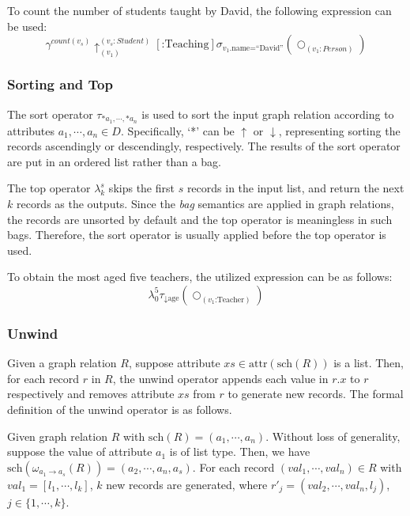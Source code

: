 \begin{example}
    To count the number of students taught by David, the following expression can be used:
    \begin{equation*}
        \gamma_{}^{count(v_s)}\uparrow_{(v_1)}^{(v_s:Student)}[\text{:Teaching}]\sigma_{v_1\text{.name=``David''}}(\bigcirc_{(v_1:Person)})
    \end{equation*}
\end{example}

\subsubsection{Sorting and Top}

The sort operator $\tau_{* a_1, \cdots, * a_n}$ is used to sort the input graph relation according to attributes $a_1, \cdots, a_n \in D$.
Specifically, `*' can be $\uparrow$ or $\downarrow$, representing sorting the records ascendingly or descendingly, respectively.
The results of the sort operator are put in an ordered list rather than a bag.

The top operator $\lambda_k^s$ skips the first $s$ records in the input list, and return the next $k$ records as the outputs.
Since the \emph{bag} semantics are applied in graph relations, the records are unsorted by default and the top operator is meaningless in such bags.
Therefore, the sort operator is usually applied before the top operator is used.

\begin{example}
    To obtain the most aged five teachers, the utilized expression can be as follows:
    \begin{equation*}
        \lambda_{0}^{5}\tau_{\downarrow \text{age}}(\bigcirc_{(v_1\text{:Teacher})})
    \end{equation*}
\end{example}


\subsubsection{Unwind}

Given a graph relation $R$, suppose attribute $xs \in \text{attr}(\text{sch}(R))$ is a list.
Then, for each record $r$ in $R$, the unwind operator appends each value in $r.x$ to $r$ respectively and removes attribute $xs$ from $r$ to generate new records.
The formal definition of the unwind operator is as follows.

\begin{definition}
    Given graph relation $R$ with $\text{sch}(R) = (a_1, \cdots, a_n)$.
    Without loss of generality, suppose the value of attribute $a_1$ is of list type.
    Then, we have $\text{sch}(\omega_{a_1 \rightarrow a_s}(R)) = (a_2, \cdots, a_n, a_s)$.
    For each record $(val_1, \cdots, val_n) \in R$ with $val_1 = [l_1, \cdots, l_k]$,  $k$ new records are generated, where $r'_j = (val_2, \cdots, val_n, l_j)$, $j \in \{1, \cdots, k\}$.
\end{definition}


